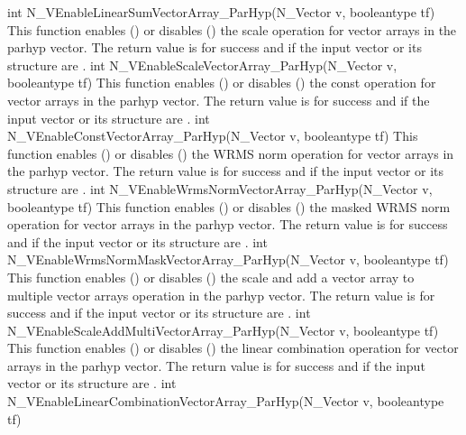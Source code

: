 {
  int N\_VEnableLinearSumVectorArray\_ParHyp(N\_Vector v, booleantype tf)
}
{
  This function enables () or disables () the scale
  operation for vector arrays in the parhyp vector. The return value is  for
  success and  if the input vector or its  structure are .
}
{
  int N\_VEnableScaleVectorArray\_ParHyp(N\_Vector v, booleantype tf)
}
{
  This function enables () or disables () the const
  operation for vector arrays in the parhyp vector. The return value is  for
  success and  if the input vector or its  structure are .
}
{
  int N\_VEnableConstVectorArray\_ParHyp(N\_Vector v, booleantype tf)
}
{
  This function enables () or disables () the WRMS norm
  operation for vector arrays in the parhyp vector. The return value is  for
  success and  if the input vector or its  structure are .
}
{
  int N\_VEnableWrmsNormVectorArray\_ParHyp(N\_Vector v, booleantype tf)
}
{
  This function enables () or disables () the masked WRMS
  norm operation for vector arrays in the parhyp vector. The return value is
   for success and  if the input vector or its  structure are
  .
}
{
  int N\_VEnableWrmsNormMaskVectorArray\_ParHyp(N\_Vector v, booleantype tf)
}
{
  This function enables () or disables () the scale and
  add a vector array to multiple vector arrays operation in the parhyp vector. The
  return value is  for success and  if the input vector or its
   structure are .
}
{
  int N\_VEnableScaleAddMultiVectorArray\_ParHyp(N\_Vector v, booleantype tf)
}
{
  This function enables () or disables () the linear
  combination operation for vector arrays in the parhyp vector. The return value
  is  for success and  if the input vector or its  structure
  are .
}
{
  int N\_VEnableLinearCombinationVectorArray\_ParHyp(N\_Vector v, booleantype tf)
}

